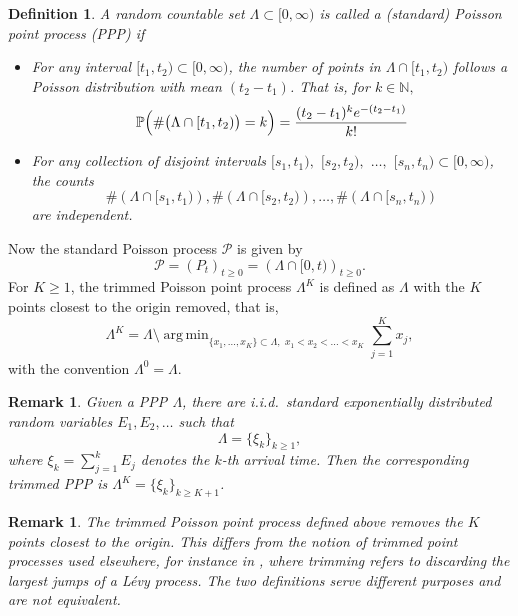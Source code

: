 \documentclass[11pt,twoside,a4paper,reqno]{amsart}
\newtheorem{definition}[theorem]{Definition}
\newtheorem{remark}[theorem]{Remark}
\renewcommand{\P}{\mathbb{P}}
\DeclareMathOperator*{\argmin}{arg\,min}
\begin{document}
\begin{definition}
A random countable set $\Lambda \subset [0, \infty)$ is called a (standard) Poisson point process (PPP) if
\begin{itemize}
\item For any interval $[t_1,t_2) \subset [0, \infty)$, the number of points in $\Lambda \cap[t_1,t_2)$ follows a Poisson distribution with mean $(t_2-t_1)$. That is, for $k\in\mathbb{N},$
\begin{equation*}
\P\Bigl(\# \bigl(\Lambda \cap [t_1,t_2)\bigr) =k\Bigr) = \frac{(t_2-t_1)^k e^{-(t_2-t_1)}}{k!}
\end{equation*}
\item For any collection of disjoint intervals $[s_1, t_1),$ $[s_2, t_2),$ $\dots,$ $[s_n, t_n)\subset [0, \infty)$, the counts
  $$
 \#\left(\Lambda \cap [s_1, t_1)\right), \#\left(\Lambda \cap [s_2, t_2)\right), \dots, \#\left(\Lambda \cap [s_n, t_n)\right)$$
  are independent.
\end{itemize}
\end{definition}

Now the standard Poisson process $\mathcal{P}$ is given by
\begin{equation*}
\mathcal{P}=(P_t)_{t\geq 0} =\left(\Lambda \cap [0,t)\right)_{t\geq 0}.
\end{equation*}
For $K\geq 1$, the trimmed Poisson point process $\Lambda^K$ is defined as $\Lambda$ with the $K$ points closest to the origin removed, that is,
$$
\Lambda^K = \Lambda \setminus \argmin_{\{x_1,\dots,x_K\}\subset \Lambda,\,\,x_1<x_2<\dots<x_K} \sum_{j=1}^K x_j,
$$
with the convention $\Lambda^0=\Lambda$.



\begin{remark}\label{PPiid}
Given a PPP $\Lambda$, there are i.i.d.\ standard exponentially distributed random variables $E_1, E_2, \dots$ such that
\begin{equation*}
\Lambda=\{\xi_k\}_{k\geq 1},
\end{equation*}
where $\xi_k = \sum_{j=1}^k E_j$ denotes the $k$-th arrival time. Then the corresponding trimmed PPP is $\Lambda^K=\{\xi_k\}_{k\geq K+1}$.
\end{remark}

\begin{remark}
The trimmed Poisson point process defined above removes the $K$ points closest to the origin. This differs from the notion of trimmed point processes used elsewhere, for instance in \cite{BIM17}, where trimming refers to discarding the largest jumps of a L\'{e}vy process. The two definitions serve different purposes and are not equivalent.
\end{remark}
\end{document}
